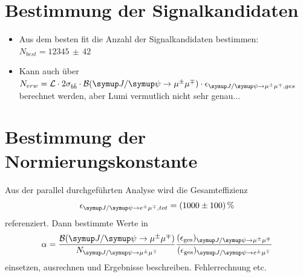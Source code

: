 \section{Bestimmung der Signalkandidaten}
%
\begin{itemize}
  \item Aus dem besten fit die Anzahl der Signalkandidaten bestimmen: $N_{best}=12345\,\pm\,42$
  \item Kann auch über $N_{erw}=\mathcal{L}\cdot 2\sigma_{b\bar{b}}\cdot\mathcal{B}(\kontroll)\cdot\epsilon_{\kontroll, ges}$ berechnet werden, aber Lumi vermutlich nicht sehr genau...
\end{itemize}
%
\section{Bestimmung der Normierungskonstante}
%
Aus der parallel durchgeführten Analyse \cite{ba-maik} wird die Gesamteffizienz
%
\begin{equation}
  \epsilon_{\signal, tot}=\SI{1000(100)}{\percent}
\end{equation}
%
referenziert. Dann bestimmte Werte in
%
\begin{equation}
  \alpha=\frac{\mathcal{B}(\kontroll)}{N_{\kontroll}}\frac{(\epsilon_{\text{ges}})_{\kontroll}}{(\epsilon_{\text{ges}})_{\signal}}
  \label{eq:konst}
\end{equation}
%
einsetzen, ausrechnen und Ergebnisse beschreiben. Fehlerrechnung etc.
